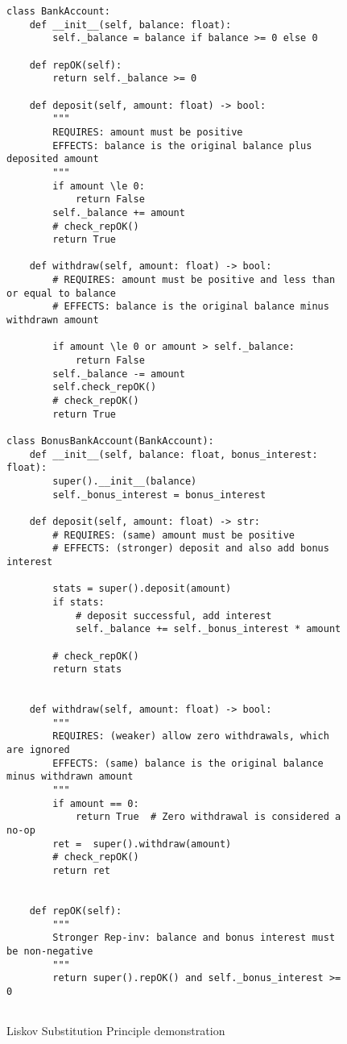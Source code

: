 \documentclass[oneside,11pt,dvipsnames]{book}
\begin{document}
\begin{figure}
    \begin{lstlisting}
class BankAccount:
    def __init__(self, balance: float):
        self._balance = balance if balance >= 0 else 0  
        
    def repOK(self):
        return self._balance >= 0

    def deposit(self, amount: float) -> bool:
        """
        REQUIRES: amount must be positive
        EFFECTS: balance is the original balance plus deposited amount
        """
        if amount \le 0:
            return False
        self._balance += amount
        # check_repOK()
        return True

    def withdraw(self, amount: float) -> bool:
        # REQUIRES: amount must be positive and less than or equal to balance
        # EFFECTS: balance is the original balance minus withdrawn amount

        if amount \le 0 or amount > self._balance:
            return False
        self._balance -= amount
        self.check_repOK()
        # check_repOK()
        return True

class BonusBankAccount(BankAccount):
    def __init__(self, balance: float, bonus_interest: float):
        super().__init__(balance)
        self._bonus_interest = bonus_interest

    def deposit(self, amount: float) -> str:
        # REQUIRES: (same) amount must be positive
        # EFFECTS: (stronger) deposit and also add bonus interest

        stats = super().deposit(amount)
        if stats:
            # deposit successful, add interest
            self._balance += self._bonus_interest * amount
        
        # check_repOK()
        return stats


    def withdraw(self, amount: float) -> bool:
        """
        REQUIRES: (weaker) allow zero withdrawals, which are ignored
        EFFECTS: (same) balance is the original balance minus withdrawn amount
        """
        if amount == 0:
            return True  # Zero withdrawal is considered a no-op
        ret =  super().withdraw(amount)
        # check_repOK()
        return ret
    
    
    def repOK(self):
        """
        Stronger Rep-inv: balance and bonus interest must be non-negative
        """
        return super().repOK() and self._bonus_interest >= 0
        
    \end{lstlisting}
\caption{Liskov Substitution Principle demonstration}\label{ex:bankaccount}
\end{figure}
\end{document}
